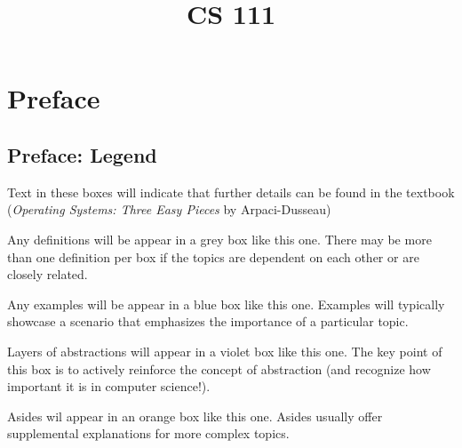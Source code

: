 \documentclass{report}
\title{CS 111}
\date{}
\begin{document}
\maketitle

\tableofcontents
\newpage

\begingroup
\renewcommand\thepart{\Alph{part}.} %
\part{Preface}
\endgroup










\chapter*{Preface: Legend}
\begin{tcolorbox}[colback=black!5!white,colframe=black!75!black,title=\textit{Operating Systems, Three Easy Pieces}]
  Text in these boxes will indicate that further details can be found in the textbook
  (\textit{Operating Systems: Three Easy Pieces} by Arpaci-Dusseau)
\end{tcolorbox}

\begin{tcolorbox}[title=Definitions]
  Any definitions will be appear in a grey box like this one. There may be more than one definition
  per box if the topics are dependent on each other or are closely related.
\end{tcolorbox}

\begin{tcolorbox}[colback=blue!5!white,colframe=black!75!blue,title=Examples]
  Any examples will be appear in a blue box like this one. Examples will typically showcase a scenario
  that emphasizes the importance of a particular topic.
\end{tcolorbox}

\begin{tcolorbox}[colback=violet!5!white,colframe=violet,title=Abstractions] 
  Layers of abstractions will appear in a violet box like this one. The key point of this box is to
  actively reinforce the concept of abstraction (and recognize how important it is in computer science!).
\end{tcolorbox}

\begin{tcolorbox}[colback=orange!5!white,colframe=black!75!orange,title=Asides]
  Asides wil appear in an orange box like this one. Asides usually offer supplemental explanations
  for more complex topics.
\end{tcolorbox}
\end{document}
